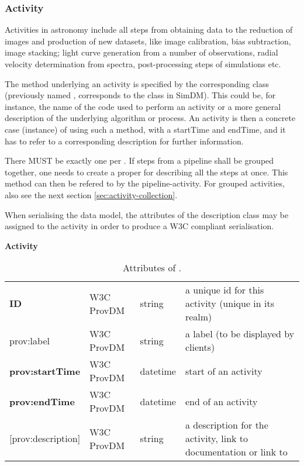



\subsubsection{Activity}
Activities in astronomy include all steps from obtaining data to the reduction of 
images and production of new datasets, like image calibration, bias subtraction, image stacking; 
light curve generation from a number of observations, radial velocity 
determination from spectra, post-processing steps of simulations etc.

The method underlying an activity is specified by the corresponding 
 class (previously named , corresponds 
to the  class in SimDM). This could be, 
for instance, the name of the code used to perform an activity or a more general 
description of the underlying algorithm or process. An activity is then a 
concrete case (instance) of using such a method, with a startTime and endTime, 
and it has to refer to a corresponding description for further information.

There MUST be exactly one  per . If steps from a 
pipeline shall be grouped together, one needs to create a proper 
 for describing all the steps at once. This method can then 
be refered to by the pipeline-activity. For grouped activities, also see the 
next section \ref{sec:activity-collection}.

When serialising the data model, the attributes
of the description class may be assigned to the activity in order to produce 
a W3C compliant serialisation.

\begin{table}[h]

\small
{}\textwidth

\textbf{\normalsize Activity}\vspace{0.25em}\\
\begin{tabulary}{1.0\textwidth}{@{}lp{2.5cm}lL@{}}
\toprule
{} &  &  & \\
\midrule
\textbf{ID} & W3C ProvDM  & string & a unique id for this activity (unique in its realm)\\
prov:label        & W3C ProvDM  & string & a label (to be displayed by clients)\\
\textbf{prov:startTime} & W3C ProvDM  & datetime & start of an activity\\
\textbf{prov:endTime} & W3C ProvDM  & datetime & end of an activity\\
{[prov:description]}  & W3C ProvDM & string & a description for the activity, 
				link to documentation or link to \\
\bottomrule
\end{tabulary}
\caption{Attributes of .}
\end{table}

